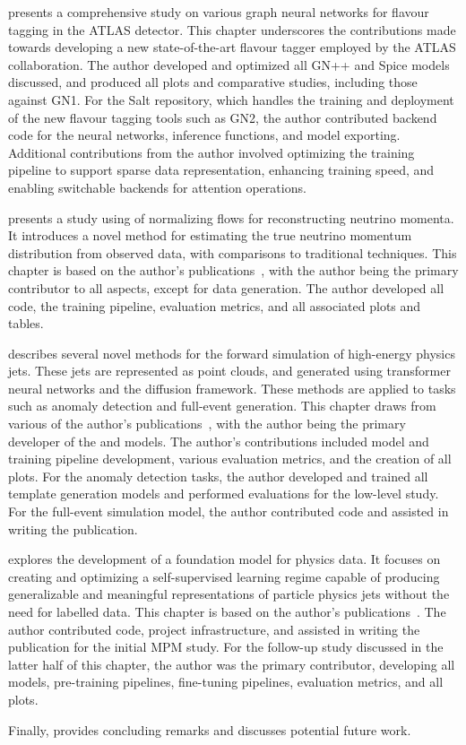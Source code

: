  presents a comprehensive study on various graph neural networks for flavour tagging in the \Gls{ATLAS} detector.
This chapter underscores the contributions made towards developing a new state-of-the-art flavour tagger employed by the \Gls{ATLAS} collaboration.
The author developed and optimized all \Gls{GN++} and \Gls{Spice} models discussed, and produced all plots and comparative studies, including those against \Gls{GN1}.
For the \Gls{Salt} repository, which handles the training and deployment of the new flavour tagging tools such as \Gls{GN2}, the author contributed backend code for the neural networks, inference functions, and model exporting.
Additional contributions from the author involved optimizing the training pipeline to support sparse data representation, enhancing training speed, and enabling switchable backends for attention operations.

 presents a study using of normalizing flows for reconstructing neutrino momenta.
It introduces a novel method for estimating the true neutrino momentum distribution from observed data, with comparisons to traditional techniques.
This chapter is based on the author's publications~\cite{Nu2Flows,NuFlows1}, with the author being the primary contributor to all aspects, except for data generation.
The author developed all code, the training pipeline, evaluation metrics, and all associated plots and tables.

 describes several novel methods for the forward simulation of high-energy physics jets.
These jets are represented as point clouds, and generated using transformer neural networks and the diffusion framework.
These methods are applied to tasks such as anomaly detection and full-event generation.
This chapter draws from various of the author's publications~\cite{PCJedi,PCDroid,EpicJedi,Drapes,PIPPIN}, with the author being the primary developer of the \pcjedi and \pcdroid models.
The author's contributions included model and training pipeline development, various evaluation metrics, and the creation of all plots.
For the anomaly detection tasks, the author developed and trained all template generation models and performed evaluations for the low-level study.
For the full-event simulation model, the author contributed code and assisted in writing the publication.

 explores the development of a foundation model for physics data.
It focuses on creating and optimizing a self-supervised learning regime capable of producing generalizable and meaningful representations of particle physics jets without the need for labelled data.
This chapter is based on the author's publications~\cite{MPM,MPM2}.
The author contributed code, project infrastructure, and assisted in writing the publication for the initial \Gls{MPM} study.
For the follow-up study discussed in the latter half of this chapter, the author was the primary contributor, developing all models, pre-training pipelines, fine-tuning pipelines, evaluation metrics, and all plots.

Finally,  provides concluding remarks and discusses potential future work.

